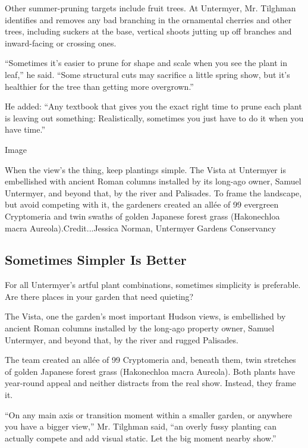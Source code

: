 Other summer-pruning targets include fruit trees. At Untermyer, Mr.
Tilghman identifies and removes any bad branching in the ornamental
cherries and other trees, including suckers at the base, vertical shoots
jutting up off branches and inward-facing or crossing ones.

``Sometimes it's easier to prune for shape and scale when you see the
plant in leaf,'' he said. ``Some structural cuts may sacrifice a little
spring show, but it's healthier for the tree than getting more
overgrown.''

He added: ``Any textbook that gives you the exact right time to prune
each plant is leaving out something: Realistically, sometimes you just
have to do it when you have time.''

Image

When the view's the thing, keep plantings simple. The Vista at Untermyer
is embellished with ancient Roman columns installed by its long-ago
owner, Samuel Untermyer, and beyond that, by the river and Palisades. To
frame the landscape, but avoid competing with it, the gardeners created
an allée of 99 evergreen Cryptomeria and twin swaths of golden Japanese
forest grass (Hakonechloa macra Aureola).Credit...Jessica Norman,
Untermyer Gardens Conservancy

\hypertarget{sometimes-simpler-is-better}{%
\subsection{Sometimes Simpler Is
Better}\label{sometimes-simpler-is-better}}

For all Untermyer's artful plant combinations, sometimes simplicity is
preferable. Are there places in your garden that need quieting?

The Vista, one the garden's most important Hudson views, is embellished
by ancient Roman columns installed by the long-ago property owner,
Samuel Untermyer, and beyond that, by the river and rugged Palisades.

The team created an allée of 99 Cryptomeria and, beneath them, twin
stretches of golden Japanese forest grass (Hakonechloa macra Aureola).
Both plants have year-round appeal and neither distracts from the real
show. Instead, they frame it.

``On any main axis or transition moment within a smaller garden, or
anywhere you have a bigger view,'' Mr. Tilghman said, ``an overly fussy
planting can actually compete and add visual static. Let the big moment
nearby show.''

